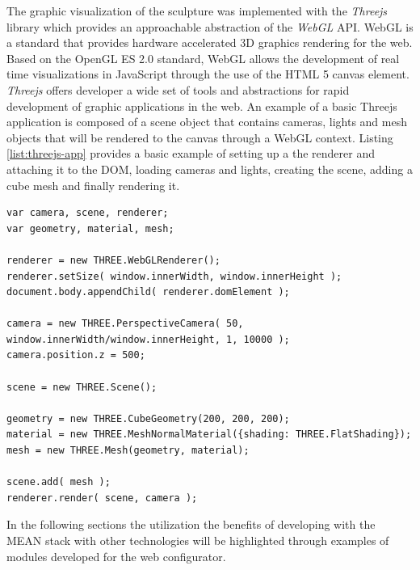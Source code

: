 \documentclass[../medieninformatik-arbeit.tex]{subfiles}
\begin{document}
The graphic visualization of the sculpture was implemented with the \textit{Threejs}\cite{cabello2010three} library which provides an approachable abstraction of the \textit{WebGL} API. WebGL is a standard that provides hardware accelerated 3D graphics rendering for the web\cite{webgl}. Based on the OpenGL ES 2.0 standard, WebGL allows the development of real time visualizations in JavaScript through the use of the HTML 5 canvas element. \textit{Threejs} offers developer a wide set of tools and abstractions for rapid development of graphic applications in the web. An example of a basic Threejs application is composed of a scene object that contains cameras, lights and mesh objects that will be rendered to the canvas through a WebGL context. Listing \ref{list:threejs-app} provides a basic example of setting up a the renderer and attaching it to the DOM, loading cameras and lights, creating the scene, adding a cube mesh and finally rendering it.

\begin{lstlisting}[style=htmlcssjs, caption={Basic Threejs 3D app example},label=list:threejs-app, float=t]
var camera, scene, renderer;
var geometry, material, mesh;

renderer = new THREE.WebGLRenderer();
renderer.setSize( window.innerWidth, window.innerHeight );
document.body.appendChild( renderer.domElement );

camera = new THREE.PerspectiveCamera( 50, window.innerWidth/window.innerHeight, 1, 10000 );
camera.position.z = 500;

scene = new THREE.Scene();
					
geometry = new THREE.CubeGeometry(200, 200, 200);
material = new THREE.MeshNormalMaterial({shading: THREE.FlatShading});
mesh = new THREE.Mesh(geometry, material);

scene.add( mesh );
renderer.render( scene, camera );
\end{lstlisting}

In the following sections the utilization the benefits of developing with the MEAN stack with other technologies will be highlighted through examples of modules developed for the web configurator. 
\end{document}

